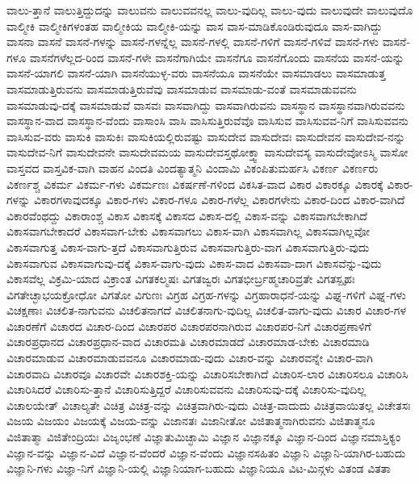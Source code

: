{ವಾಲು-ತ್ತಾನೆ
ವಾಲುತ್ತಿದ್ದುದನ್ನು
ವಾಲುವನು
ವಾಲುವವನಲ್ಲ
ವಾಲು-ವುದಿಲ್ಲ
ವಾಲು-ವುದು
ವಾಲುವುದೇ
ವಾಲುವುದೊ
ವಾಲ್ಮೀಕಿ
ವಾಲ್ಮೀಕಿಗಳಂತಹ
ವಾಲ್ಮೀಕಿಯ
ವಾಲ್ಮೀಕಿ-ಯನ್ನು
ವಾಸ
ವಾಸ-ಮಾಡಿಕೊಂಡಿರುವುದೂ
ವಾಸ-ವಾಗಿದ್ದು
ವಾಸನಾ
ವಾಸನೆ
ವಾಸನೆ-ಗಳನ್ನು
ವಾಸನೆ-ಗಳನ್ನೆಲ್ಲ
ವಾಸನೆ-ಗಳಲ್ಲಿ
ವಾಸನೆ-ಗಳಿಗೆ
ವಾಸನೆ-ಗಳಿವೆ
ವಾಸನೆ-ಗಳು
ವಾಸನೆ-ಗಳೂ
ವಾಸನೆಗಳೆಲ್ಲದ-ರಿಂದ
ವಾಸನೆ-ಗಳೇ
ವಾಸನೆಗಾಗಿಯೇ
ವಾಸನೆಗೂ
ವಾಸನೆಗೊಂದು
ವಾಸನೆಯ
ವಾಸನೆ-ಯನ್ನು
ವಾಸನೆ-ಯಾಗಲಿ
ವಾಸನೆ-ಯಾಗಿ
ವಾಸನೆಯುಳ್ಳ-ವರು
ವಾಸನೆಯೂ
ವಾಸನೆಯೇ
ವಾಸಮಾಡಲು
ವಾಸಮಾಡುತ್ತ
ವಾಸಮಾಡುತ್ತಿರುವನು
ವಾಸಮಾಡುತ್ತಿರುವೆವು
ವಾಸಮಾಡುವ
ವಾಸಮಾಡು-ವಂತೆ
ವಾಸಮಾಡುವವನು
ವಾಸಮಾಡುವು-ದಕ್ಕೆ
ವಾಸಮಾಡುವೆ
ವಾಸವಃ
ವಾಸವಾಗಿದ್ದು
ವಾಸವಾಗಿರುವನು
ವಾಸಸ್ಥಾನ
ವಾಸಸ್ಥಾನವಾಗಿರುವವನು
ವಾಸಸ್ಥಾನ-ವಾದ
ವಾಸಸ್ಥಾನ-ವೆಂದು
ವಾಸಾಂಸಿ
ವಾಸಿ
ವಾಸಿಸುತ್ತಿರುವೆವೊ
ವಾಸಿಸುವ
ವಾಸಿಸುವವ-ನಿಗೆ
ವಾಸಿಸುವವನು
ವಾಸಿಸುವ-ವರು
ವಾಸುಕಿ
ವಾಸುಕಿಃ
ವಾಸುಕಿಯಲ್ಲಿರುವಷ್ಟು
ವಾಸುದೇವ
ವಾಸುದೇವಃ
ವಾಸುದೇವನ
ವಾಸುದೇವ-ನನ್ನು
ವಾಸುದೇವ-ನಿಗೆ
ವಾಸುದೇವನೇ
ವಾಸುದೇವಮಯ
ವಾಸುದೇವಸ್ತಥೋಕ್ತ್ವಾ
ವಾಸುದೇವಸ್ಯ
ವಾಸುದೇವೋಽಸ್ಮಿ
ವಾಸೋ
ವಾಸ್ತವದ
ವಾಸ್ತವಿಕ-ವಾಗಿ
ವಾಹನ
ವಿಂದತಿ
ವಿಂದತ್ಯಾತ್ಮನಿ
ವಿಂದಾಮಿ
ವಿಕಂಪಿತುಮರ್ಹಸಿ
ವಿಕರ್ಣ
ವಿಕರ್ಣರು
ವಿಕರ್ಣಶ್ಚ
ವಿಕರ್ಮ
ವಿಕರ್ಮ-ಗಳು
ವಿಕರ್ಮಣಃ
ವಿಕರ್ಷಣೆ-ಗಳಿಂದ
ವಿಕಸಿತ-ವಾದ
ವಿಕಾರ
ವಿಕಾರಕ್ಕೂ
ವಿಕಾರಕ್ಕೆ
ವಿಕಾರ-ಗಳನ್ನು
ವಿಕಾರಗಳಾವುದಕ್ಕೂ
ವಿಕಾರ-ಗಳು
ವಿಕಾರ-ಗಳೂ
ವಿಕಾರ-ಗಳೆಲ್ಲ
ವಿಕಾರಗಳೇನು
ವಿಕಾರ-ದಿಂದ
ವಿಕಾರ-ವಾಗಿದೆ
ವಿಕಾರವೆಂಥದ್ದು
ವಿಕಾರಾಂಶ್ಚ
ವಿಕಾಸ
ವಿಕಾಸಕ್ಕೆ
ವಿಕಾಸದ
ವಿಕಾಸ-ದಲ್ಲಿ
ವಿಕಾಸ-ವನ್ನು
ವಿಕಾಸವಾಗಬೇಕಾಗಿದೆ
ವಿಕಾಸವಾಗಬೇಕಾದರೆ
ವಿಕಾಸವಾಗ-ಬೇಕು
ವಿಕಾಸವಾಗಲು
ವಿಕಾಸ-ವಾಗಿ
ವಿಕಾಸವಾಗಿಲ್ಲ
ವಿಕಾಸವಾಗಿಲ್ಲವೋ
ವಿಕಾಸವಾಗುತ್ತ
ವಿಕಾಸ-ವಾಗು-ತ್ತದೆ
ವಿಕಾಸವಾಗುತ್ತಿರುವ
ವಿಕಾಸವಾಗುತ್ತಿರು-ವಾಗ
ವಿಕಾಸವಾಗುತ್ತಿರು-ವುದು
ವಿಕಾಸವಾಗುವ
ವಿಕಾಸವಾಗುವು-ದಕ್ಕೆ
ವಿಕಾಸ-ವಾಗು-ವುದು
ವಿಕಾಸ-ವಾದ
ವಿಕಾಸವಾ-ದಾಗ
ವಿಕಾಸವೆನ್ನು-ವುದು
ವಿಕಾಸವೆಲ್ಲ
ವಿಕ್ರಮಿ-ಯಾದ
ವಿಕ್ರಾಂತ
ವಿಗತಕಲ್ಮಷಃ
ವಿಗತಜ್ವರಃ
ವಿಗತಭೀರ್ಬ್ರಹ್ಮಚಾರಿವ್ರತೇ
ವಿಗತಸ್ಪೃಹಃ
ವಿಗತೇಚ್ಛಾಭಯಕ್ರೋಧೋ
ವಿಗತೋ
ವಿಗುಣಃ
ವಿಗ್ರಹ
ವಿಗ್ರಹ-ಗಳನ್ನು
ವಿಗ್ರಹಾರಾಧನೆ-ಯನ್ನು
ವಿಘ್ನ-ಗಳಿಗೆ
ವಿಘ್ನ-ಗಳು
ವಿಚಕ್ಷಣಾಃ
ವಿಚಲಿತ-ನಾಗುವನು
ವಿಚಲಿತನಾಗದೆ
ವಿಚಲಿತನಾಗು-ವುದಿಲ್ಲ
ವಿಚಲಿತ-ವಾಗು-ವುದು
ವಿಚಾರ
ವಿಚಾರ-ಗಳ
ವಿಚಾರಣೆಗೆ
ವಿಚಾರದ
ವಿಚಾರ-ದಿಂದ
ವಿಚಾರಪರ
ವಿಚಾರಪರನಾಗಿರುವ
ವಿಚಾರಪರ-ನಿಗೆ
ವಿಚಾರಪ್ರಣಾಳಿಗೆ
ವಿಚಾರಪ್ರಧಾನದ
ವಿಚಾರಪ್ರಧಾನ-ವಾದ
ವಿಚಾರಮತಿ
ವಿಚಾರಮಾಡದೆ
ವಿಚಾರಮಾಡ-ಬೇಕು
ವಿಚಾರಮಾಡಿ
ವಿಚಾರಮಾಡುವ
ವಿಚಾರಮಾಡುವವನೂ
ವಿಚಾರಮಾಡು-ವುದು
ವಿಚಾರ-ವನ್ನು
ವಿಚಾರವನ್ನೇ
ವಿಚಾರ-ವಾಗಿ
ವಿಚಾರವಾದಿ
ವಿಚಾರವೂ
ವಿಚಾರವೇ
ವಿಚಾರಶಕ್ತಿ-ಯನ್ನು
ವಿಚಾರಿಸಬೇಕಾಗಿದೆ
ವಿಚಾರಿಸ-ಲಾರ
ವಿಚಾರಿಸಲೂ
ವಿಚಾರಿಸಿ
ವಿಚಾರಿಸಿದರೆ
ವಿಚಾರಿಸು-ತ್ತಾನೆ
ವಿಚಾರಿಸುತ್ತಿದ್ದರೆ
ವಿಚಾರಿಸುವವನು
ವಿಚಾರಿಸುವು-ದಕ್ಕೆ
ವಿಚಾರಿಸು-ವುದಿಲ್ಲ
ವಿಚಾಲಯೇತ್
ವಿಚಾಲ್ಯತೇ
ವಿಚಿತ್ರ
ವಿಚಿತ್ರ-ವನ್ನು
ವಿಚಿತ್ರವಾಗಿರು-ವುದು
ವಿಚಿತ್ರ-ವಾದುದು
ವಿಚಿತ್ರವಾಯಿತಲ್ಲ
ವಿಚೇತಸಃ
ವಿಜಯ
ವಿಜಯಂ
ವಿಜಯಕ್ಕೆ
ವಿಜಯ-ವನ್ನು
ವಿಜಾನತಃ
ವಿಜಾನೀತೋ
ವಿಜಿತಾತ್ಮನಾಗಿರುವನು
ವಿಜಿತಾತ್ಮನೂ
ವಿಜಿತಾತ್ಮಾ
ವಿಜಿತೇಂದ್ರಿಯಃ
ವಿಜೃಂಭಣೆ
ವಿಜ್ಞಾತುಮಿಚ್ಛಾಮಿ
ವಿಜ್ಞಾನ
ವಿಜ್ಞಾನಕ್ಕೂ
ವಿಜ್ಞಾನ-ದಿಂದ
ವಿಜ್ಞಾನಮಾಸ್ತಿಕ್ಯಂ
ವಿಜ್ಞಾನ-ವನ್ನು
ವಿಜ್ಞಾನ-ವಿದೆ
ವಿಜ್ಞಾನ-ವೆಂದರೆ
ವಿಜ್ಞಾನ-ವೆಂದು
ವಿಜ್ಞಾನಸಹಿತಂ
ವಿಜ್ಞಾನಿ
ವಿಜ್ಞಾನಿ-ಯಾಗಿರ-ಬಹುದು
ವಿಜ್ಞಾನಿ-ಗಳು
ವಿಜ್ಞಾ-ನಿಗೆ
ವಿಜ್ಞಾನಿ-ಯಲ್ಲಿ
ವಿಜ್ಞಾನಿಯಾಗ-ಬಹುದು
ವಿಜ್ಞಾನಿಯೂ
ವಿಟ-ಮಿನ್ಗಳು
ವಿತಂಡ
ವಿತತಾ
}
